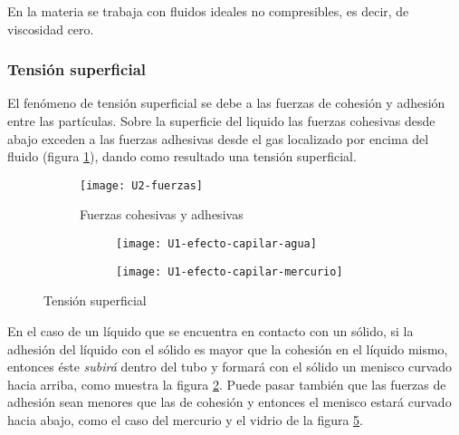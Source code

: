 En la materia \materia se trabaja con fluidos ideales no compresibles, es decir, de viscosidad cero.\\

\subsubsection{Tensión superficial}

El fenómeno de tensión superficial se debe a las fuerzas de cohesión y adhesión entre las partículas. Sobre la superficie del liquido las fuerzas cohesivas desde abajo exceden a las fuerzas adhesivas desde el gas localizado por encima del fluido (figura \ref{fuerzas_cohesivas_adhesivas}), dando como resultado una tensión superficial.

\begin{figure}[h]
	\centering
	\begin{subfigure}[b]{.45\linewidth}
		\centering
		\texttt{[image: U2-fuerzas]}
		\caption{Fuerzas cohesivas y adhesivas}
		\label{fuerzas_cohesivas_adhesivas}
	\end{subfigure}
	\begin{subfigure}[b]{.45\linewidth}
		\centering
		\begin{subfigure}[b]{.45\linewidth}
			\texttt{[image: U1-efecto-capilar-agua]}
			\caption{}
			\label{fig:capilaridad-agua}
		\end{subfigure}
		\begin{subfigure}[b]{.45\linewidth}
			\texttt{[image: U1-efecto-capilar-mercurio]}
			\caption{}
			\label{fig:capilaridad-mercurio}
		\end{subfigure}
	\end{subfigure}
	\caption{Tensión superficial}
\end{figure}

En el caso de un líquido que se encuentra en contacto con un sólido, si la adhesión del líquido con el sólido es mayor que la cohesión en el líquido mismo, entonces éste \emph{subirá} dentro del tubo y formará con el sólido un menisco curvado hacia arriba, como muestra la figura \ref{fig:capilaridad-agua}. Puede pasar también que las fuerzas de adhesión sean menores que las de cohesión y entonces el menisco estará curvado hacia abajo, como el caso del mercurio y el vidrio de la figura \ref{fig:capilaridad-mercurio}.\\ %

